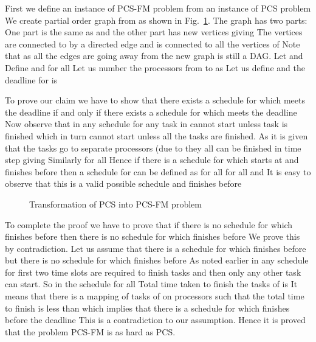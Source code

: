 \documentclass[journal]{IEEEtran}
\begin{document}
First we define an instance of PCS-FM problem  from an instance of PCS problem  We
create partial order graph  from  as
shown in Fig.~\ref{fig:scheduling}. The graph  has two
parts: One part is the same as  and the other part
has  new vertices  giving  The vertices  are connected
to  by a directed edge and  is connected to all the vertices
of  Note that as all the edges are going away from 
the new graph is still a DAG. Let  and  Define  and
 for all  Let us number the
processors from  to  as  Let us define  and the deadline for  is 

To prove our claim we have to show that there exists a schedule
 for  which meets the deadline  if
and only if there exists a schedule  for  which meets
the deadline  Now observe that in any schedule  for 
any task in  cannot start unless task  is finished
which in turn cannot start unless all the tasks 
are finished. As it is given that the tasks  go to
separate processors (due to  they all can be finished in 
time step giving  Similarly
 for all  Hence
if there is a schedule  for  which starts at
 and finishes before  then a schedule  for  can be
defined as  for all 
 for all  and  It is
easy to observe that this is a valid possible schedule and finishes
before 

\begin{figure}[tbp]
  \centering
{}
 \caption{Transformation of PCS into PCS-FM problem}
  \label{fig:scheduling}
\end{figure}


To complete the proof we have to prove that if there is no schedule
for  which finishes before  then there is no
schedule for  which finishes before  We prove
this by contradiction. Let us assume that there is a schedule 
for  which finishes before  but there is no schedule for
 which finishes before  As noted earlier in any
schedule for  first two time slots are required to finish tasks
 and then only any other task can start. So in the
schedule  for all  Total
time taken to finish the tasks of  is  It means that there is a mapping of
tasks of  on  processors such that the total time to
finish is less than  which implies that there is a
schedule for  which finishes before the deadline 
This is a contradiction to our assumption. Hence it is proved that the
problem PCS-FM is as hard as PCS.
\end{document}
